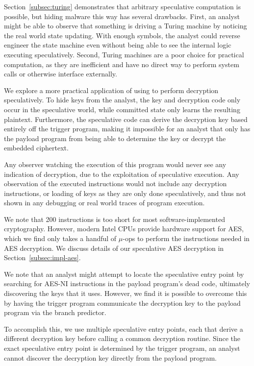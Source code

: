 Section~\ref{subsec:turing} demonstrates that arbitrary speculative computation
is possible, but hiding malware this way has several drawbacks. First, an
analyst might be able to observe that something is driving a Turing
machine by noticing the real world state updating. With enough symbols, the
analyst could reverse engineer the state machine even without being able to see
the internal logic executing speculatively. Second, Turing machines are a
poor choice for practical computation, as they are inefficient and have no direct
way to perform system calls or otherwise interface externally.

We explore a more practical application of using \speculake to perform
decryption speculatively. To hide keys from the analyst, the key and decryption
code only occur in the speculative world, while committed state only learns the
resulting plaintext. Furthermore, the speculative code can
derive the decryption key based entirely off the trigger program, making it
impossible for an analyst that only has the payload program from being able to
determine the key or decrypt the embedded ciphertext.


Any observer watching the execution of this program would never see any
indication of decryption, due to the exploitation of speculative execution. Any
observation of the executed instructions would not include any decryption
instructions, or loading of keys as they are only done speculatively, and thus
not shown in any debugging or real world traces of program execution. 

We note that 200 instructions is too short for most software-implemented
cryptography. However, modern Intel CPUs provide hardware support for AES, which
we find only takes a handful of $\mu$-ops to perform the instructions needed in
AES decryption. We discuss details of our speculative AES decryption in
Section~\ref{subsec:impl-aes}.

\medskip

We note that an analyst might attempt to locate the speculative entry point by
searching for AES-NI instructions in the payload program's dead code, ultimately
discovering the keys that it uses. However, we find it is possible to overcome
this by having the trigger program communicate the decryption key to the payload
program via the branch predictor.

To accomplish this, we use multiple speculative entry points, each that derive a
different decryption key before calling a common decryption routine. Since
the exact speculative entry point is determined by the trigger program, an
analyst cannot discover the decryption key directly from the payload program.

